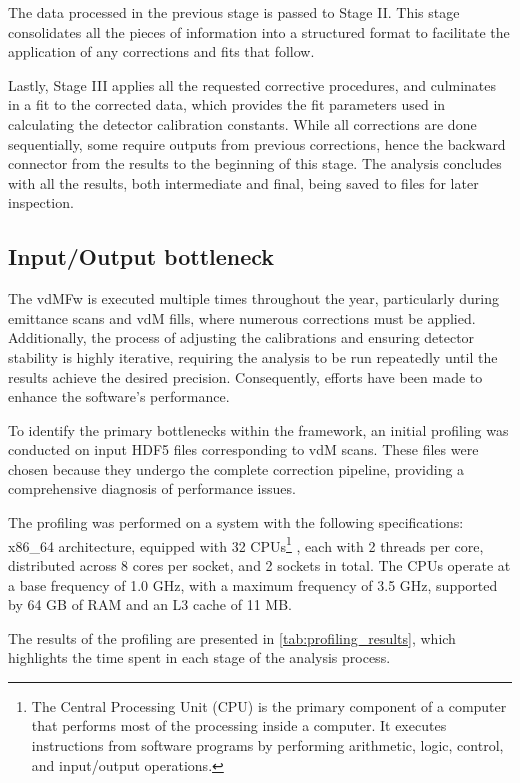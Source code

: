 The data processed in the previous stage is passed to Stage II. This stage consolidates all the pieces of information into a structured format to facilitate the application of any corrections and fits that follow.

Lastly, Stage III applies all the requested corrective procedures, and culminates in a fit to the corrected data, which provides the fit parameters used in calculating the detector calibration constants. While all corrections are done sequentially, some require outputs from previous corrections, hence the backward connector from the results to the beginning of this stage. The analysis concludes with all the results, both intermediate and final, being saved to files for later inspection.

\subsection{Input/Output bottleneck}
\label{subsec:io_bottleneck}

The vdMFw is executed multiple times throughout the year, particularly during emittance scans and vdM fills, where numerous corrections must be applied. Additionally, the process of adjusting the calibrations and ensuring detector stability is highly iterative, requiring the analysis to be run repeatedly until the results achieve the desired precision. Consequently, efforts have been made to enhance the software's performance.

To identify the primary bottlenecks within the framework, an initial profiling was conducted on input HDF5 files corresponding to vdM scans. These files were chosen because they undergo the complete correction pipeline, providing a comprehensive diagnosis of performance issues.

The profiling was performed on a system with the following specifications: x86\_64 architecture, equipped with 32 CPUs\footnote{The Central Processing Unit (CPU) is the primary component of a computer that performs most of the processing inside a computer. It executes instructions from software programs by performing arithmetic, logic, control, and input/output operations.}
, each with 2 threads per core, distributed across 8 cores per socket, and 2 sockets in total. The CPUs operate at a base frequency of 1.0 GHz, with a maximum frequency of 3.5 GHz, supported by 64 GB of RAM and an L3 cache of 11 MB.

The results of the profiling are presented in \autoref{tab:profiling_results}, which highlights the time spent in each stage of the analysis process.

